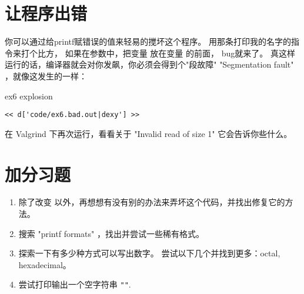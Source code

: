 \section{让程序出错}

你可以通过给printf赋错误的值来轻易的搅坏这个程序。 用那条打印我的名字的指令来打个比方， 如果在参数中，把变量  放在变量  的前面， bug就来了。 真这样运行的话，编译器就会对你发飙，你必须会得到个"段故障" "Segmentation fault" ，就像这发生的一样：

\begin{code}{ex6 explosion}
\begin{lstlisting}
<< d['code/ex6.bad.out|dexy'] >>
\end{lstlisting}
\end{code}

在 Valgrind 下再次运行，看看关于 "Invalid read of size 1" 它会告诉你些什么。


\section{加分习题}

\begin{enumerate}
\item 除了改变  以外，再想想有没有别的办法来弄坏这个代码，并找出修复它的方法。
\item 搜索 "printf formats" ，找出并尝试一些稀有格式。
\item 探索一下有多少种方式可以写出数字。 尝试以下几个并找到更多：octal, hexadecimal。
\item 尝试打印输出一个空字符串 \verb|""|.
\end{enumerate}

